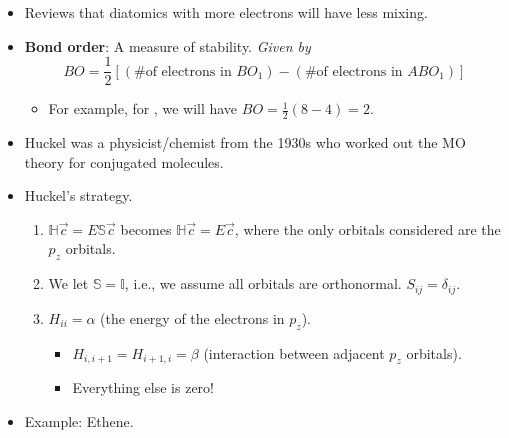 \documentclass[../notes.tex]{subfiles}
\begin{document}
\begin{itemize}
    \item {}Reviews that diatomics with more electrons will have less mixing.
    \item \textbf{Bond order}: A measure of stability. \emph{Given by}
    \begin{equation*}
        BO = \frac{1}{2}[(\text{\# of electrons in }BO_1)-(\text{\# of electrons in }ABO_1)]
    \end{equation*}
    \begin{itemize}
        \item For example, for , we will have $BO=\frac{1}{2}(8-4)=2$.
    \end{itemize}
    \item Huckel was a physicist/chemist from the 1930s who worked out the MO theory for conjugated molecules.
    \item Huckel's strategy.
    \begin{enumerate}
        \item $\mathbb{H}\vec{c}=E\mathbb{S}\vec{c}$ becomes $\mathbb{H}\vec{c}=E\vec{c}$, where the only orbitals considered are the $p_z$ orbitals.
        \item We let $\mathbb{S}=\mathbb{I}$, i.e., we assume all orbitals are orthonormal. $S_{ij}=\delta_{ij}$.
        \item $H_{ii}=\alpha$ (the energy of the electrons in $p_z$).
        \begin{itemize}
            \item $H_{i,i+1}=H_{i+1,i}=\beta$ (interaction between adjacent $p_z$ orbitals).
            \item Everything else is zero!
        \end{itemize}
    \end{enumerate}
    \item Example: Ethene.
    \begin{figure}[h!]
        \centering
        \footnotesize
\end{figure}
\end{itemize}
\end{document}
